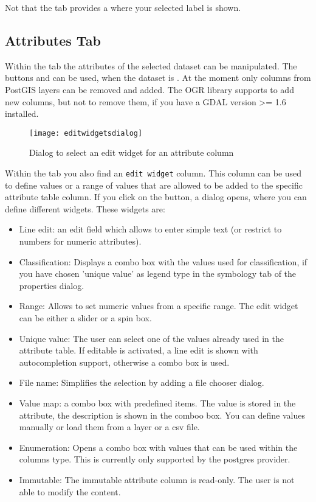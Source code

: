 Not that the  tab provides a  where your
selected label is shown.

\subsection{Attributes Tab}\label{label_attributes}

Within the  tab the attributes of the selected dataset can be
manipulated. The buttons  and
 can be
used, when the dataset is .
At the moment only columns from PostGIS layers can be removed and added. The
OGR library supports to add new columns, but not to remove them, if you have
a GDAL version >= 1.6 installed.


\begin{figure}[ht]
   \centering
   \caption{Dialog to select an edit widget for an attribute column
\nixcaption}\label{fig:editwidget}
   \texttt{[image: editwidgetsdialog]}
\end{figure}

Within the  tab you also find an \texttt{edit widget} column.
This column can be used to define values or a range of values that are
allowed
to be added to the specific attribute table column. If you click on the
 button, a dialog opens, where you can define different
widgets. These widgets are:

\begin{itemize}[label=--]
\item Line edit: an edit field which allows to enter simple text (or restrict
to
numbers for numeric attributes).
\item Classification: Displays a combo box with the values used for
classification, if you have chosen 'unique value' as legend type in the
symbology tab of the properties dialog.
\item Range: Allows to set numeric values from a specific range. The edit
widget can be either a slider or a spin box.
\item Unique value: The user can select one of the values already used in the
attribute table. If editable is activated, a line edit is shown with
autocompletion support, otherwise a combo box is used.
\item File name: Simplifies the selection by adding a file chooser dialog.
\item Value map: a combo box with predefined items. The value is stored in
the attribute, the description is shown in the comboo box. You can define
values manually or load them from a layer or a csv file.
\item Enumeration: Opens a combo box with values that can be used within the
columns type. This is currently only supported by the postgres provider.
\item Immutable: The immutable attribute column is read-only. The user is not
able to modify the content.
\end{itemize}

